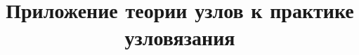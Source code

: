\documentclass[a4paper]{scrartcl}
\begin{document}
\title{Приложение теории узлов к практике узловязания}

\stealcurrent
\end{document}
